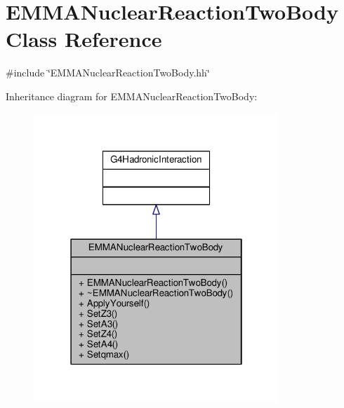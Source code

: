 \hypertarget{classEMMANuclearReactionTwoBody}{}\section{E\+M\+M\+A\+Nuclear\+Reaction\+Two\+Body Class Reference}
\label{classEMMANuclearReactionTwoBody}


{\ttfamily \#include \char`\"{}E\+M\+M\+A\+Nuclear\+Reaction\+Two\+Body.\+hh\char`\"{}}



Inheritance diagram for E\+M\+M\+A\+Nuclear\+Reaction\+Two\+Body\+:
\nopagebreak
\begin{figure}[H]
\begin{center}
\leavevmode
\includegraphics[width=262pt]{classEMMANuclearReactionTwoBody__inherit__graph}
\end{center}
\end{figure}


